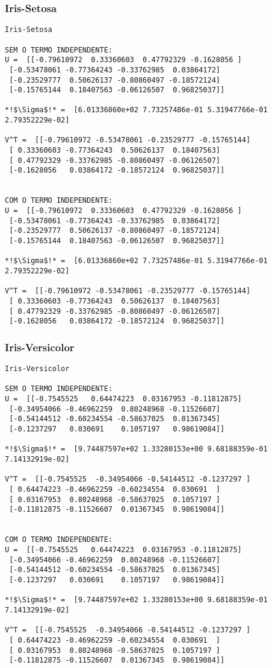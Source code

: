 \documentclass[a4paper,12pt,twoside]{article}
\begin{document}
\subsubsection{Iris-Setosa}
\begin{lstlisting}
Iris-Setosa

SEM O TERMO INDEPENDENTE: 
U =  [[-0.79610972  0.33360603  0.47792329 -0.1628056 ]
 [-0.53478061 -0.77364243 -0.33762985  0.03864172]
 [-0.23529777  0.50626137 -0.80860497 -0.18572124]
 [-0.15765144  0.18407563 -0.06126507  0.96825037]]

*!$\Sigma$!* =  [6.01336860e+02 7.73257486e-01 5.31947766e-01 2.79352229e-02]

V^T =  [[-0.79610972 -0.53478061 -0.23529777 -0.15765144]
 [ 0.33360603 -0.77364243  0.50626137  0.18407563]
 [ 0.47792329 -0.33762985 -0.80860497 -0.06126507]
 [-0.1628056   0.03864172 -0.18572124  0.96825037]]


COM O TERMO INDEPENDENTE: 
U =  [[-0.79610972  0.33360603  0.47792329 -0.1628056 ]
 [-0.53478061 -0.77364243 -0.33762985  0.03864172]
 [-0.23529777  0.50626137 -0.80860497 -0.18572124]
 [-0.15765144  0.18407563 -0.06126507  0.96825037]]

*!$\Sigma$!* =  [6.01336860e+02 7.73257486e-01 5.31947766e-01 2.79352229e-02]

V^T =  [[-0.79610972 -0.53478061 -0.23529777 -0.15765144]
 [ 0.33360603 -0.77364243  0.50626137  0.18407563]
 [ 0.47792329 -0.33762985 -0.80860497 -0.06126507]
 [-0.1628056   0.03864172 -0.18572124  0.96825037]]
\end{lstlisting}

\subsubsection{Iris-Versicolor}
\begin{lstlisting}
Iris-Versicolor

SEM O TERMO INDEPENDENTE: 
U =  [[-0.7545525   0.64474223  0.03167953 -0.11812875]
 [-0.34954066 -0.46962259  0.80248968 -0.11526607]
 [-0.54144512 -0.60234554 -0.58637025  0.01367345]
 [-0.1237297   0.030691    0.1057197   0.98619084]]

*!$\Sigma$!* =  [9.74487597e+02 1.33280153e+00 9.68188359e-01 7.14132919e-02]

V^T =  [[-0.7545525  -0.34954066 -0.54144512 -0.1237297 ]
 [ 0.64474223 -0.46962259 -0.60234554  0.030691  ]
 [ 0.03167953  0.80248968 -0.58637025  0.1057197 ]
 [-0.11812875 -0.11526607  0.01367345  0.98619084]]


COM O TERMO INDEPENDENTE: 
U =  [[-0.7545525   0.64474223  0.03167953 -0.11812875]
 [-0.34954066 -0.46962259  0.80248968 -0.11526607]
 [-0.54144512 -0.60234554 -0.58637025  0.01367345]
 [-0.1237297   0.030691    0.1057197   0.98619084]]

*!$\Sigma$!* =  [9.74487597e+02 1.33280153e+00 9.68188359e-01 7.14132919e-02]

V^T =  [[-0.7545525  -0.34954066 -0.54144512 -0.1237297 ]
 [ 0.64474223 -0.46962259 -0.60234554  0.030691  ]
 [ 0.03167953  0.80248968 -0.58637025  0.1057197 ]
 [-0.11812875 -0.11526607  0.01367345  0.98619084]]
\end{lstlisting}
\end{document}

